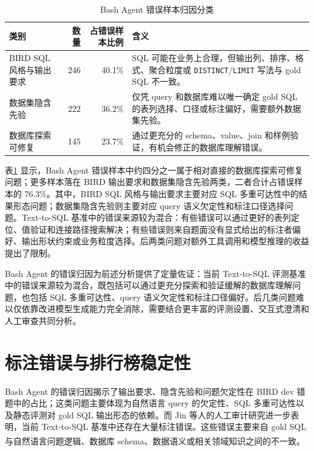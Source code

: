 \documentclass[
    bachelor,
    pdflinks,
]{xjtuthesis}
\newcommand{\upcite}[1]{\textsuperscript{\cite{#1}}}
\newcommand{\topcaption}[1]{\caption{#1}}
\begin{document}
\begin{table}[htbp]\small
  \centering
  \topcaption{Bash Agent 错误样本归因分类}
  \label{tab:bash_reflection_categories}
  \begin{tabularx}{\textwidth}{lrrX}
    \toprule[1.5pt]
    \textbf{类别} & \textbf{数量} & \textbf{占错误样本比例} & \textbf{含义} \\
    \midrule[1pt]
    BIRD SQL 风格与输出要求 & 246 & 40.1\% & SQL 可能在业务上合理，但输出列、排序、格式、聚合粒度或 \texttt{DISTINCT}/\texttt{LIMIT} 写法与 gold SQL 不一致。 \\
    数据集隐含先验 & 222 & 36.2\% & 仅凭 query 和数据库难以唯一确定 gold SQL 的表列选择、口径或标注偏好，需要额外数据集先验。 \\
    数据库探索可修复 & 145 & 23.7\% & 通过更充分的 schema、value、join 和样例验证，有机会修正的数据库理解错误。 \\
    \bottomrule[1.5pt]
  \end{tabularx}
\end{table}

表\ref{tab:bash_reflection_categories} 显示，Bash Agent 错误样本中约四分之一属于相对直接的数据库探索可修复问题；更多样本落在 BIRD 输出要求和数据集隐含先验两类，二者合计占错误样本的 76.3\%。其中，BIRD SQL 风格与输出要求主要对应 SQL 多重可达性中的结果形态问题；数据集隐含先验则主要对应 query 语义欠定性和标注口径选择问题。Text-to-SQL 基准中的错误来源较为混合：有些错误可以通过更好的表列定位、值验证和连接路径搜索解决；有些错误则来自题面没有显式给出的标注者偏好、输出形状约束或业务粒度选择。后两类问题对额外工具调用和模型推理的收益提出了限制。

Bash Agent 的错误归因为前述分析提供了定量佐证：当前 Text-to-SQL 评测基准中的错误来源较为混合，既包括可以通过更充分探索和验证缓解的数据库理解问题，也包括 SQL 多重可达性、query 语义欠定性和标注口径偏好。后几类问题难以仅依靠改进模型生成能力完全消除，需要结合更丰富的评测设置、交互式澄清和人工审查共同分析。

\section{标注错误与排行榜稳定性}

Bash Agent 的错误归因揭示了输出要求、隐含先验和问题欠定性在 BIRD dev 错题中的占比；这类问题主要体现为自然语言 query 的欠定性、SQL 多重可达性以及静态评测对 gold SQL 输出形态的依赖。而 Jin 等人的人工审计研究进一步表明，当前 Text-to-SQL 基准中还存在大量标注错误。这些错误主要来自 gold SQL 与自然语言问题逻辑、数据库 schema、数据语义或相关领域知识之间的不一致\upcite{jin2026annotationErrors}。
\end{document}
